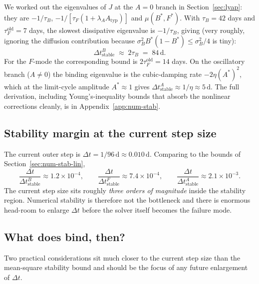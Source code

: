 We worked out the eigenvalues of $J$ at the $A=0$ branch in
Section~\ref{sec:lyap}: they are $-1/\tau_B$, $-1/[\tau_F(1+\lambda_A A_{\mathrm{typ}})]$
and $\mu(B^*,F^*)$. With $\tau_B = 42$ days and
$\tau_F^{\mathrm{old}} = 7$ days, the slowest dissipative
eigenvalue is $-1/\tau_B$, giving (very roughly, ignoring the
diffusion contribution because $\sigma_B^2 B^*(1-B^*) \le \sigma_B^2/4$
is tiny):
\begin{equation}
  \Delta t_{\mathrm{stable}}^{B} \;\approx\; 2\tau_B \;=\; 84\,\mathrm{d}.
\end{equation}
For the $F$-mode the corresponding bound is $2\tau_F^{\mathrm{old}} = 14$ days.
On the oscillatory branch ($A \neq 0$) the binding eigenvalue is the
cubic-damping rate $-2\eta (A^*)^2$, which at the limit-cycle
amplitude $A^* \approx 1$ gives
$\Delta t_{\mathrm{stable}}^{A} \approx 1/\eta \approx 5\,\mathrm{d}$.
The full derivation, including Young's-inequality bounds that
absorb the nonlinear corrections cleanly, is in
Appendix~\ref{app:num-stab}.

\subsection{Stability margin at the current step size}\label{sec:num-stab-margin}

The current outer step is $\Delta t = 1/96\,\mathrm{d} \approx 0.010\,\mathrm{d}$.
Comparing to the bounds of Section~\ref{sec:num-stab-lin},
\begin{equation}
  \frac{\Delta t}{\Delta t_{\mathrm{stable}}^{B}} \approx 1.2 \times 10^{-4},
  \qquad
  \frac{\Delta t}{\Delta t_{\mathrm{stable}}^{F}} \approx 7.4 \times 10^{-4},
  \qquad
  \frac{\Delta t}{\Delta t_{\mathrm{stable}}^{A}} \approx 2.1 \times 10^{-3}.
\end{equation}
The current step size sits roughly \emph{three orders of magnitude}
inside the stability region. Numerical stability is therefore not
the bottleneck and there is enormous head-room to enlarge
$\Delta t$ before the solver itself becomes the failure mode.

\subsection{What does bind, then?}\label{sec:num-stab-binding}

Two practical considerations sit much closer to the current step
size than the mean-square stability bound and should be the focus
of any future enlargement of $\Delta t$.

